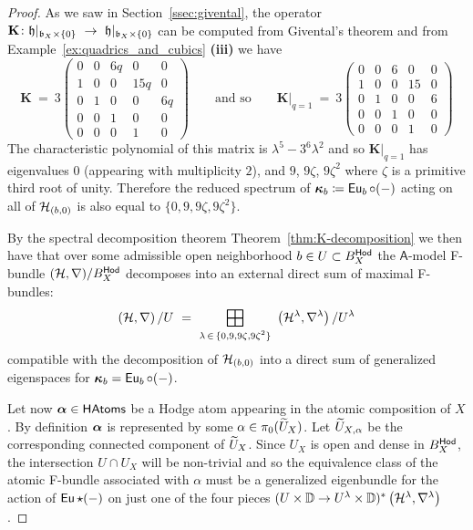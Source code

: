 \documentclass[twoside,leqno]{article}
\numberwithin{equation}{section}
\theoremstyle{plain}
\theoremstyle{definition}
\begin{document}
\begin{proof}
As we saw in Section~\ref{ssec:givental}, the operator  $\mathbf{K} \colon \smallfiber|_{\smallbase_{X}\times \{0\}}  \ \to \ \smallfiber|_{\smallbase_{X}\times \{0\}}$ can be computed from Givental's theorem 
and from Example~\ref{ex:quadrics_and_cubics} {\bfseries (iii)} we have 
\[
\mathbf{K} \ = \ 3\begin{pmatrix}
0 & 0 & 6q & 0 & 0 \\
1 & 0 & 0 & 15q & 0 \\
0 & 1 & 0 & 0 & 6q \\
0 & 0 & 1 & 0 & 0 \\
0 & 0 & 0 & 1 & 0
\end{pmatrix} \qquad \text{and so} \qquad 
\mathbf{K}|_{q=1} \ = \ 3\begin{pmatrix}
0 & 0 & 6 & 0 & 0 \\
1 & 0 & 0 & 15 & 0 \\
0 & 1 & 0 & 0 & 6 \\
0 & 0 & 1 & 0 & 0 \\
0 & 0 & 0 & 1 & 0
\end{pmatrix}
\]
The characteristic polynomial of this matrix is $\lambda^5 - 3^6\lambda^2$ and so 
$\mathbf{K}|_{q=1}$ has eigenvalues $0$ (appearing with multiplicity $2$), and  $9$, $9\zeta$, $9\zeta^2$ where $\zeta$ is a primitive third root of unity. Therefore the reduced spectrum of $\boldsymbol{\kappa}_{b} \coloneqq \operatorname{\mathsf{Eu}}_{b}\circ (-)$ acting  on all of $\mathcal H_{(b,0)}$ is also equal to  $\{0,9,9\zeta,9\zeta^2\}$. 

By the spectral decomposition theorem Theorem~\ref{thm:K-decomposition} we then have that
over some admissible open neighborhood $b \in U \subset B_{X}^{\mathsf{Hod}}$ the  $\mathsf{A}$-model F-bundle $(\mathcal H,\nabla)/B_{X}^{\mathsf{Hod}}$  decomposes into an external direct sum of maximal F-bundles:
\[
\left(\cH,\nabla\right)/U \ = \ \bplus_{\substack{\lambda \, \in \, \{0,9,9\zeta,9\zeta^2\}}} \
\left(\cH^\lambda,\nabla^\lambda\right)/U^{\lambda}
\]
compatible with the decomposition of $\mathcal H_{(b,0)}$ into a direct sum of generalized eigenspaces for $\boldsymbol{\kappa}_{b} = \operatorname{\mathsf{Eu}}_{b}\circ (-)$. 


Let now $\boldsymbol{\alpha} \in \mathsf{HAtoms}$ be a Hodge atom appearing in the atomic composition of $X$. By definition $\boldsymbol{\alpha}$ is represented by some $\alpha \in  \pi_{0}(\widetilde U_{X})$. Let $\widetilde U_{X,\alpha}$ be the corresponding connected component of $\widetilde U_{X}$. Since $U_{X}$ is open and dense in $B_{X}^{\mathsf{Hod}}$, the intersection 
$U \cap U_{X}$ will be non-trivial 
and so the equivalence class of the atomic F-bundle associated with $\alpha$ must be a generalized eigenbundle for the action of $\operatorname{\mathsf{Eu}}\star(-)$ on just one of the four pieces $(U\times \mathbb D \to U^{\lambda}\times \mathbb D)^{*}\left(\mathcal H^{\lambda},\nabla^{\lambda}\right)$ .


\end{proof}
\end{document}
